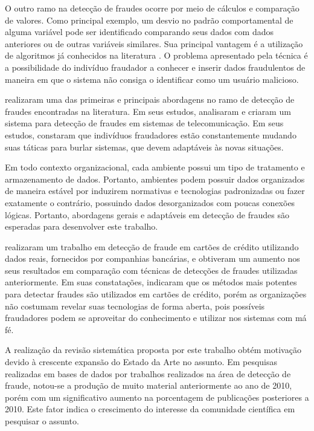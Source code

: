 \documentclass[smallextended]{svjour3}       %
\begin{document}
O outro ramo na detecção de fraudes ocorre por meio de cálculos e comparação de valores. Como principal exemplo, um desvio no padrão comportamental de alguma variável pode ser identificado comparando seus dados com dados anteriores ou de outras variáveis similares. Sua principal vantagem é a utilização de algoritmos já conhecidos na literatura \citep{Fawcett1997}. O problema apresentado pela técnica é a possibilidade do indivíduo fraudador a conhecer e inserir dados fraudulentos de maneira em que o sistema não consiga o identificar como um usuário malicioso.

\cite{Fawcett1997} realizaram uma das primeiras e principais abordagens no ramo de detecção de fraudes encontradas na literatura. Em seus estudos, analisaram e criaram um sistema para detecção de fraudes em sistemas de telecomunicação. Em seus estudos, constaram que indivíduos fraudadores estão constantemente mudando suas táticas para burlar sistemas, que devem adaptáveis às novas situações.

Em todo contexto organizacional, cada ambiente possui um tipo de tratamento e armazenamento de dados. Portanto, ambientes podem possuir dados organizados de maneira estável por induzirem normativas e tecnologias padronizadas ou fazer exatamente o contrário, possuindo dados desorganizados com poucas conexões lógicas. Portanto, abordagens gerais e adaptáveis em detecção de fraudes são esperadas para desenvolver este trabalho.

\cite{Fawcett1997} realizaram um trabalho em detecção de fraude em cartões de crédito utilizando dados reais, fornecidos por companhias bancárias, e obtiveram um aumento nos seus resultados em comparação com técnicas de detecções de fraudes utilizadas anteriormente. Em suas constatações, indicaram que os métodos mais potentes para detectar fraudes são utilizados em cartões de crédito, porém as organizações não costumam revelar suas tecnologias de forma aberta, pois possíveis fraudadores podem se aproveitar do conhecimento e utilizar nos sistemas com má fé.

A realização da revisão sistemática proposta por este trabalho obtém motivação devido à crescente expansão do Estado da Arte no assunto. Em pesquisas realizadas em bases de dados por trabalhos realizados na área de detecção de fraude, notou-se a produção de muito material anteriormente ao ano de 2010, porém com um significativo aumento na porcentagem de publicações posteriores a 2010. Este fator indica o crescimento do interesse da comunidade científica em pesquisar o assunto.
\end{document}
